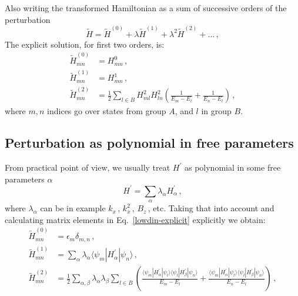 \documentclass[10pt, onecolumn, aps, prb, superscriptaddress, floatfix, showpacs, notitlepage]{revtex4-1}
\newcommand{\bra}[1]{\langle #1|}
\newcommand{\ket}[1]{|#1\rangle}
\begin{document}
Also writing the transformed Hamiltonian as a sum of successive orders of the perturbation
\begin{equation}
\tilde{H} = \tilde{H}^{(0)} + \lambda \tilde{H}^{(1)} + \lambda^2 \tilde{H}^{(2)} + \ldots\,,
\end{equation}
The explicit solution, for first two orders, is:
\begin{subequations}
\label{lowdin-explicit}
\begin{align}
    \tilde{H}^{(0)}_{mn} &= H^0_{mn} \,,\\
    \tilde{H}^{(1)}_{mn} &= H^1_{mn} \,,\\
    \tilde{H}^{(2)}_{mn} &= \frac{1}{2} \sum_{l\in B}
    H^{2}_{m l} H^{2}_{l n}
    \left(\frac{1}{E_m - E_l} + \frac{1}{E_n - E_l}\right)\,,
\end{align}
\end{subequations}
where $m, n$ indices go over states from group $A$, and $l$ in group $B$.



\subsection{Perturbation as polynomial in free parameters}
From practical point of view, we usually treat $H^{\prime}$ as polynomial in some free parameters $\alpha$
\begin{equation}
H^{\prime} = \sum_\alpha \lambda_\alpha H^{\prime}_\alpha\,,
\end{equation}
where $\lambda_\alpha$ can be in example $k_x\,$, $k_x^2\,$, $B_z\,$, etc.
Taking that into account and calculating matrix elements in Eq.~\eqref{lowdin-explicit} explicitly we obtain:
\begin{subequations}
\label{lowdin-explicit}
\begin{align}
    \tilde{H}^{(0)}_{mn} &= \epsilon_m \delta_{m,n} \,,\\
    \tilde{H}^{(1)}_{mn} &= \sum_{\alpha} \lambda_\alpha \bra{\psi_m} H^{\prime}_\alpha \ket{\psi_n} \,,\\
    \tilde{H}^{(2)}_{mn} &= \frac{1}{2} \sum_{\alpha,\beta} \lambda_\alpha\lambda_\beta\sum_{l\in B}
    \left(\frac{\bra{\psi_m}H^{\prime}_{\alpha}\ket{\psi_l}\bra{\psi_l}H^{\prime}_{\beta}\ket{\psi_n}}{E_m - E_l} + \frac{\bra{\psi_m}H^{\prime}_{\alpha}\ket{\psi_l}\bra{\psi_l}H^{\prime}_{\beta}\ket{\psi_n}}{E_n - E_l}\right)\,,
\end{align}
\end{subequations}
\end{document}
